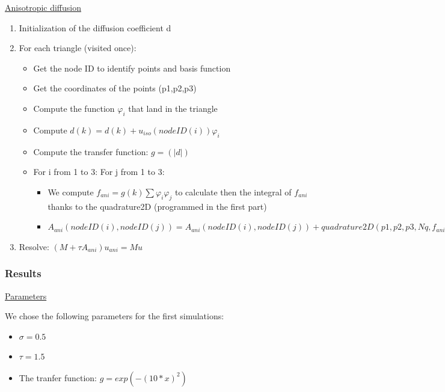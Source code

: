 \documentclass{report}
\renewcommand\phi{\varphi}
\begin{document}
\underline{Anisotropic diffusion}
\begin{enumerate}

    
    \item 
    Initialization of the diffusion coefficient d
     \item 
     For each triangle (visited once):
     \begin{itemize}
          \item
          Get the node ID to identify points and basis function
          \item 
          Get the coordinates of the points (p1,p2,p3) 
          \item 
          Compute the function $\phi_i$ that land in the triangle
          \item 
          Compute $d(k) = d(k) + u_{iso}(nodeID(i)) \phi_i$
          \item 
          Compute the transfer function: $g=(|d|)$
          \item 
          For i from 1 to 3: 
          For j from 1 to 3: 
          \begin{itemize}
          \item
              We compute $f_{ani} = g(k) \sum {\phi_i \phi_j}$ to calculate then the integral of $f_{ani}$ thanks to the quadrature2D (programmed in the first part) 
          \item
              $A_{ani}(nodeID(i),nodeID(j)) =  A_{ani}(nodeID(i),nodeID(j)) + quadrature2D (p1,p2,p3,Nq,f_{ani})$
         
          \end{itemize}
          
     \end{itemize}
     \item 
     Resolve: $(M + \tau A_{ani}) u_{ani} = M u$
\end{enumerate}



\subsubsection{Results}


\underline{Parameters}

We chose the following parameters for the first simulations: 
\begin{itemize}
\item
$\sigma=0.5$
\item
$\tau=1.5$
\item
The tranfer function: $g= exp(-(10*x)^2)$ \\
\end{itemize}
\end{document}
